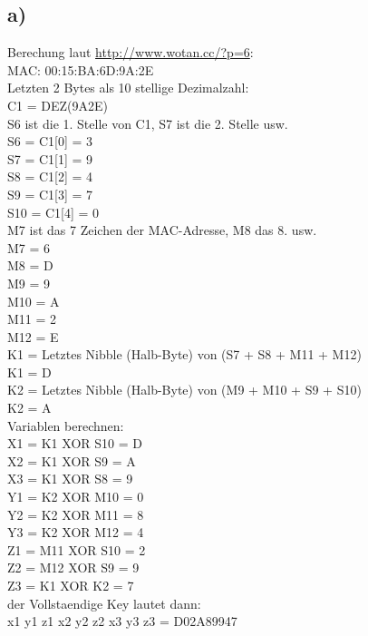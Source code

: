 \documentclass[10pt,a4paper]{article}
\begin{document}
\subsection{a)}
Berechung laut \href{http://www.wotan.cc/?p=6}{http://www.wotan.cc/?p=6}:\\
MAC: 00:15:BA:6D:9A:2E\\
Letzten 2 Bytes als 10 stellige Dezimalzahl:\\
C1 = DEZ(9A2E)\\
 
S6 ist die 1. Stelle von C1, S7 ist die 2. Stelle usw.\\
S6 = C1[0] = 3 \\
S7 = C1[1] = 9 \\
S8 = C1[2] = 4 \\
S9 = C1[3] = 7 \\
S10 = C1[4] = 0 \\
 
M7 ist das 7 Zeichen der MAC-Adresse, M8 das 8. usw.\\
M7 =  6 \\
M8 =  D \\
M9 =  9 \\
M10 =  A \\
M11 =  2 \\
M12 =  E \\

K1 = Letztes Nibble (Halb-Byte) von (S7 + S8 + M11 + M12)\\
K1 =  D \\

K2 = Letztes Nibble (Halb-Byte) von (M9 + M10 + S9 + S10)\\
K2 =  A \\

Variablen berechnen:\\
X1 = K1  XOR S10 =  D \\
X2 = K1  XOR S9  =  A \\
X3 = K1  XOR S8  =  9 \\
Y1 = K2  XOR M10 =  0 \\
Y2 = K2  XOR M11 =  8 \\
Y3 = K2  XOR M12 =  4 \\
Z1 = M11 XOR S10 =  2 \\
Z2 = M12 XOR S9  =  9 \\
Z3 = K1  XOR K2  =  7 \\
 
der Vollstaendige Key lautet dann:\\
x1 y1 z1 x2 y2 z2 x3 y3 z3 = D02A89947 \\\\
\end{document}
